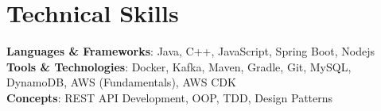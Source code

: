 \section{Technical Skills}\label{sec:techSkills}
\startListPointOneInchAwayFromLeft
\vspace{4pt}
\item{
    \textbf{Languages \& Frameworks}{: Java, C++, JavaScript, Spring Boot, Nodejs} \\[0.5ex]
    \textbf{Tools \& Technologies}{: Docker, Kafka, Maven, Gradle, Git, MySQL, DynamoDB, AWS (Fundamentals), AWS CDK} \\[0.5ex]
    \textbf{Concepts}{: REST API Development, OOP, TDD, Design Patterns}
}
\makeLinePointOneInchAwayEnd

